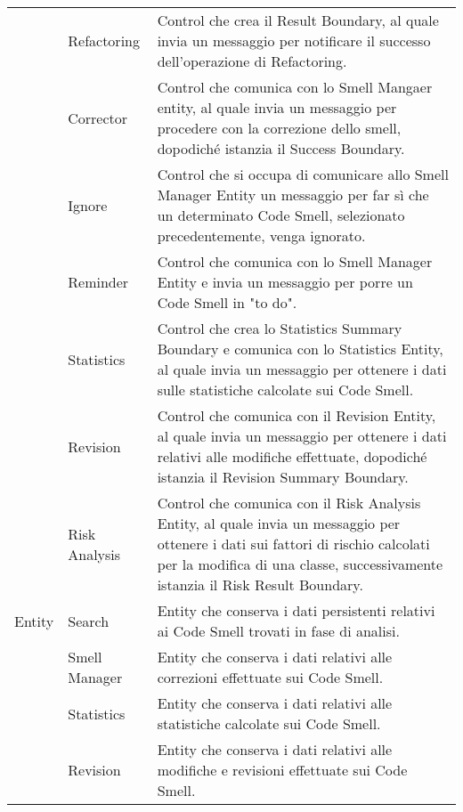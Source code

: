 \begin{tabular}{|l|p{3.5cm}|p{11cm}|}
	& Refactoring & Control che crea il Result Boundary, al quale invia un messaggio per notificare il successo dell'operazione di Refactoring. \\
	& Corrector & Control che comunica con lo Smell Mangaer entity, al quale invia un messaggio per procedere con la correzione dello smell, dopodiché istanzia il Success Boundary. \\ 
	& Ignore & Control che si occupa di comunicare allo Smell Manager Entity un messaggio per far sì che un determinato Code Smell, selezionato precedentemente, venga ignorato. \\ 
	& Reminder & Control che comunica con lo Smell Manager Entity e invia un messaggio per porre un Code Smell in "to do". \\ 
	& Statistics & Control che crea lo Statistics Summary Boundary e comunica con lo Statistics Entity, al quale invia un messaggio per ottenere i dati sulle statistiche calcolate sui Code Smell. \\
	& Revision & Control che comunica con il Revision Entity, al quale invia un messaggio per ottenere i dati relativi alle modifiche effettuate, dopodiché istanzia il Revision Summary Boundary. \\ 
	& Risk Analysis & Control che comunica con il Risk Analysis Entity, al quale invia un messaggio per ottenere i dati sui fattori di rischio calcolati per la modifica di una classe, successivamente istanzia il Risk Result Boundary. \\ \hline 
	Entity & Search & Entity che conserva i dati persistenti relativi ai Code Smell trovati in fase di analisi. \\ 
	& Smell Manager & Entity che conserva i dati relativi alle correzioni effettuate sui Code Smell. \\ 
	& Statistics & Entity che conserva i dati relativi alle statistiche calcolate sui Code Smell. \\ 
	& Revision & Entity che conserva i dati relativi alle modifiche e revisioni effettuate sui Code Smell. \\ \hline
	
\end{tabular}